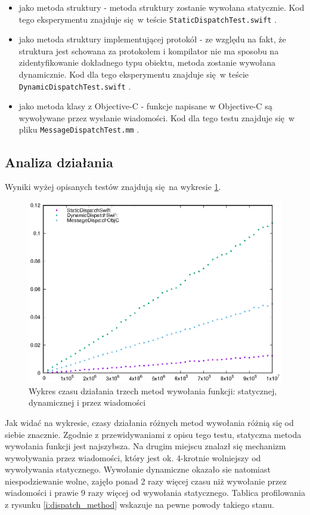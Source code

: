 \documentclass[mgr, shortabstract]{iithesis}
\newcommand{\swiftinline}[1]{
    \texttt{#1}
}
\begin{document}
\begin{itemize}
    \item jako metoda struktury - metoda struktury zostanie wywołana statycznie. Kod tego eksperymentu znajduje się w teście \swiftinline{StaticDispatchTest.swift}.
    \item jako metoda struktury implementującej protokół - ze względu na fakt, że struktura jest schowana za protokołem i kompilator nie ma sposobu na zidentyfikowanie dokładnego typu obiektu, metoda zostanie wywołana dynamicznie. Kod dla tego eksperymentu znajduje się w teście \swiftinline{DynamicDispatchTest.swift}.
    \item jako metoda klasy z Objective-C - funkcje napisane w Objective-C są wywoływane przez wysłanie wiadomości. Kod dla tego testu znajduje się w pliku \swiftinline{MessageDispatchTest.mm}.
\end{itemize}

\subsection{Analiza działania}

Wyniki wyżej opisanych testów znajdują się na wykresie \ref{p:dispatch_method}.

\begin{figure}
    \includegraphics{plots/Dispatch.eps}
    \caption{Wykres czasu działania trzech metod wywołania funkcji: statycznej, dynamicznej i przez wiadomości}
    \label{p:dispatch_method}
\end{figure}

Jak widać na wykresie, czasy działania różnych metod wywołania różnią się od siebie znacznie. Zgodnie z przewidywaniami z opisu tego testu, statyczna metoda wywołania funkcji jest najszybsza. Na drugim miejscu znalazł się mechanizm wywoływania przez wiadomości, który jest ok. 4-krotnie wolniejszy od wywoływania statycznego. Wywołanie dynamiczne okazało sie natomiast niespodziewanie wolne, zajęło ponad 2 razy więcej czasu niż wywołanie przez wiadomości i prawie 9 razy więcej od wywołania statycznego. Tablica profilowania z rysunku \ref{i:dispatch_method} wskazuje na pewne powody takiego stanu.
\end{document}
